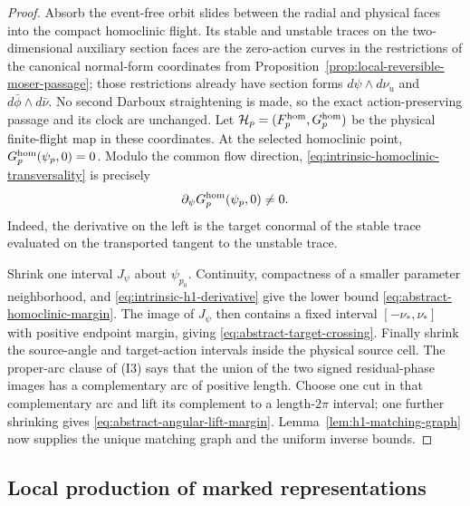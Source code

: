 \documentclass[11pt]{amsart}
\numberwithin{equation}{section}
\theoremstyle{definition}
\theoremstyle{remark}
\begin{document}
\begin{proof}
Absorb the event-free orbit slides between the radial and physical faces
into the compact homoclinic flight.  Its stable and unstable traces on the
two-dimensional auxiliary section faces are the zero-action curves in the
restrictions of the canonical normal-form coordinates from
Proposition~\ref{prop:local-reversible-moser-passage}; those restrictions
already have section forms $d\psi\wedge d\nu_u$ and
$d\bar\phi\wedge d\bar\nu$.  No second Darboux straightening is made, so
the exact action-preserving passage and its clock are unchanged.  Let
$\mathcal H_p=(F_p^{\rm hom},G_p^{\rm hom})$ be the physical finite-flight
map in these coordinates.  At the selected homoclinic point,
$G_p^{\rm hom}(\psi_p,0)=0$.  Modulo the common flow direction,
\eqref{eq:intrinsic-homoclinic-transversality} is precisely
\begin{equation}\label{eq:intrinsic-h1-derivative}
 \partial_\psi G_p^{\rm hom}(\psi_p,0)\ne0.
\end{equation}
Indeed, the derivative on the left is the target conormal of the stable
trace evaluated on the transported tangent to the unstable trace.

Shrink one interval $J_\psi$ about $\psi_{p_0}$.  Continuity, compactness
of a smaller parameter neighborhood, and
\eqref{eq:intrinsic-h1-derivative} give the lower bound
\eqref{eq:abstract-homoclinic-margin}.  The image of $J_\psi$ then contains
a fixed interval $[-\nu_*,\nu_*]$ with positive endpoint margin, giving
\eqref{eq:abstract-target-crossing}.  Finally shrink the source-angle and
target-action intervals inside the physical source cell.  The proper-arc
clause of \textup{(I3)} says that the union of the two signed
residual-phase images has a complementary arc of positive length.  Choose
one cut in that complementary arc and lift its complement to a
length-$2\pi$ interval; one further shrinking gives
\eqref{eq:abstract-angular-lift-margin}.  Lemma~\ref{lem:h1-matching-graph}
now supplies the unique matching graph and the uniform inverse bounds.
\end{proof}

\subsection{Local production of marked representations}
\end{document}
